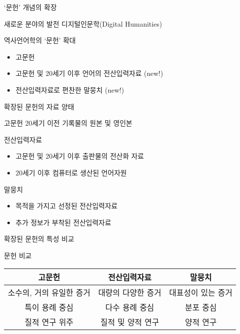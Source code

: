 \documentclass[11pt, aspectratio=169]{beamer}
\begin{document}
\begin{frame}[t]{‘문헌’ 개념의 확장}
  \begin{block}{새로운 분야의 발전}
      디지털인문학(Digital Humanities)
  \end{block}
  
  \begin{block}{역사언어학의 ‘문헌’ 확대}
    \begin{itemize}
      \item 고문헌
      \item 고문헌 및 20세기 이후 언어의 전산입력자료 (new!)
      \item 전산입력자료로 편찬한 말뭉치 (new!)
    \end{itemize}    
  \end{block}
\end{frame}

\begin{frame}[t]{확장된 문헌의 자료 양태}
  \begin{block}{고문헌}
    20세기 이전 기록물의 원본 및 영인본
  \end{block}

  \begin{block}{전산입력자료}
      \begin{itemize}
        \item 고문헌 및 20세기 이후 출판물의 전산화 자료
        \item 20세기 이후 컴퓨터로 생산된 언어자원 
      \end{itemize}
  \end{block}

  \begin{block}{말뭉치}
      \begin{itemize}
        \item 목적을 가지고 선정된 전산입력자료
        \item 추가 정보가 부착된 전산입력자료
      \end{itemize}
  \end{block}
\end{frame}

\begin{frame}[t]{확장된 문헌의 특성 비교}
  \begin{block}{문헌 비교}
    \begin{center}
      \begin{tabular}{c|c|c}
        \textbf{고문헌} & \textbf{전산입력자료} & \textbf{말뭉치} \\
        \hline
        소수의, 거의 유일한 증거 & 대량의 다양한 증거 & 대표성이 있는 증거 \\
        특이 용례 중심 & 다수 용례 중심 & 분포 중심 \\
        질적 연구 위주 & 질적 및 양적 연구 & 양적 연구 \\
      \end{tabular}
    \end{center}    
  \end{block}
  
\end{frame}
\end{document}
